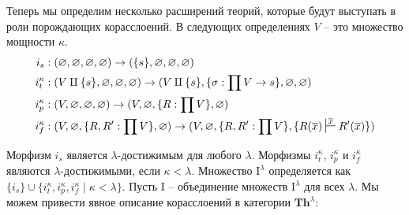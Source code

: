 \documentclass[reqno]{amsart}
\theoremstyle{definition}
\theoremstyle{remark}
\newcommand{\bcat}[1]{\mathbf{#1}}
\newcommand{\Th}{\bcat{Th}}
\newcommand{\I}{\mathrm{I}}
\begin{document}
Теперь мы определим несколько расширений теорий, которые будут выступать в роли порождающих корасслоений.
В следующих определениях $V$ -- это множество мощности $\kappa$.
\begin{align*}
i_s & : (\varnothing,\varnothing,\varnothing,\varnothing) \to (\{ s \},\varnothing,\varnothing,\varnothing) \\
i_t^\kappa & : (V \amalg \{ s \}, \varnothing, \varnothing, \varnothing) \to (V \amalg \{ s \}, \{ \sigma : \prod V \to s \}, \varnothing, \varnothing) \\
i_p^\kappa & : (V, \varnothing, \varnothing, \varnothing) \to (V, \varnothing, \{ R : \prod V \}, \varnothing) \\
i_f^\kappa & : (V, \varnothing, \{ R, R' : \prod V \}, \varnothing) \to (V, \varnothing, \{ R, R' : \prod V \}, \{ R(\overline{x}) \sststile{}{\overline{x}} R'(\overline{x}) \})
\end{align*}

Морфизм $i_s$ является $\lambda$-достижимым для любого $\lambda$.
Морфизмы $i_t^\kappa$, $i_p^\kappa$ и $i_f^\kappa$ являются $\lambda$-достижимыми, если $\kappa < \lambda$.
Множество $\I^\lambda$ определяется как $\{ i_s \} \cup \{ i_t^\kappa, i_p^\kappa, i_f^\kappa \mid \kappa < \lambda \}$.
Пусть $\I$ -- объединение множеств $\I^\lambda$ для всех $\lambda$.
Мы можем привести явное описание корасслоений в категории $\Th^\lambda$:
\end{document}
